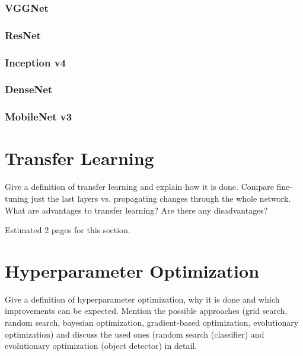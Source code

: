 \documentclass[draft,final]{vutinfth} %
\begin{document}
\subsubsection{VGGNet}
\label{sssec:theory-vggnet}

\subsubsection{ResNet}
\label{sssec:theory-resnet}

\subsubsection{Inception v4}
\label{sssec:theory-inception-v4}

\subsubsection{DenseNet}
\label{sssec:theory-densenet}

\subsubsection{MobileNet v3}
\label{sssec:theory-mobilenet-v3}



\section{Transfer Learning}
\label{sec:background-transfer-learning}

Give a definition of transfer learning and explain how it is
done. Compare fine-tuning just the last layers vs. propagating changes
through the whole network. What are advantages to transfer learning?
Are there any disadvantages?

Estimated 2 pages for this section.

\section{Hyperparameter Optimization}
\label{sec:background-hypopt}

Give a definition of hyperparameter optimization, why it is done and
which improvements can be expected. Mention the possible approaches
(grid search, random search, bayesian optimization, gradient-based
optimization, evolutionary optimization) and discuss the used ones
(random search (classifier) and evolutionary optimization (object
detector) in detail.
\end{document}
